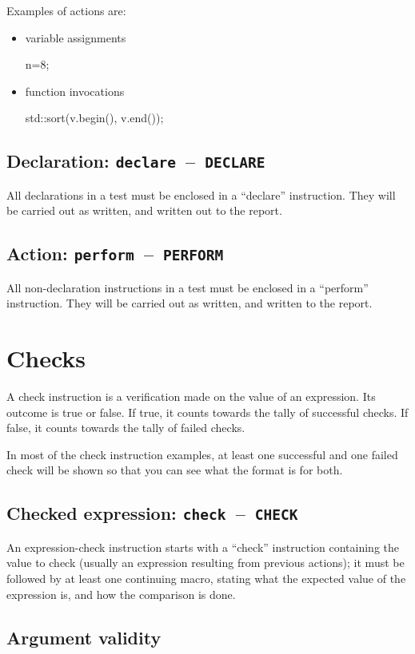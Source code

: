 \documentclass[twoside, a4paper, article]{memoir}
\newcommand*\testudocolor{\color{red!80!blue}}
\newcommand*\testudo[1]{\texttt{\testudocolor{}#1}}
\newcommand*\testudopair[2]{\testudo{#1}~--~\testudo{#2}}
\newcommand\subsectiontestudopair[3]{%
  \subsection[#1]{#1: \testudopair{#2}{#3}}}
\newcommand\typesetexampleandreport[1]{%
  \typesetexamplesource{#1}
  \typesetexamplereport{#1}
}
\providecommand\typesetexamplereport[1]{%
}
\providecommand\typesetexamplesource[1]{%
}
\begin{document}
Examples of actions are:
\begin{itemize}
\item variable assignments
\begin{cpplisting}
n=8;
\end{cpplisting}

\item function invocations
\begin{cpplisting}
std::sort(v.begin(), v.end());
\end{cpplisting}
\end{itemize}

\subsectiontestudopair{Declaration}{declare}{DECLARE}
\label{sec:declaration}

All declarations in a test must be enclosed in a ``declare'' instruction.  They
will be carried out as written, and written out to the report.

\typesetexampleandreport{declare}

\subsectiontestudopair{Action}{perform}{PERFORM}
\label{sec:action}

All non-declaration instructions in a test must be enclosed in a ``perform''
instruction.  They will be carried out as written, and written to the report.

\typesetexampleandreport{perform}


\section{Checks}
\label{sec:checks}

A check instruction is a verification made on the value of an expression.  Its
outcome is true or false.  If true, it counts towards the tally of successful
checks.  If false, it counts towards the tally of failed checks.

In most of the check instruction examples, at least one successful and one
failed check will be shown so that you can see what the format is for both.

\subsectiontestudopair{Checked expression}{check}{CHECK}
\label{sec:checked-expression}

An expression-check instruction starts with a ``check'' instruction containing
the value to check (usually an expression resulting from previous actions); it
must be followed by at least one continuing macro, stating what the expected
value of the expression is, and how the comparison is done.

\subsection{Argument validity}
\label{sec:argument-validity}
\end{document}

